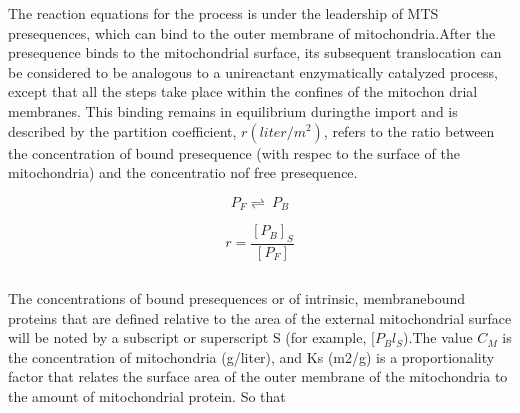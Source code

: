 The reaction equations for the process is under the leadership of MTS presequences, which can bind to the outer membrane of mitochondria.After the presequence binds to the mitochondrial surface, its subsequent translocation can be considered to be analogous to a unireactant enzymatically catalyzed process, except that all the steps take place within the confines of the mitochon­ drial membranes. This binding remains in equilibrium dur­ingthe import and is described by  the partition  coefficient,  $r (liter/ 
m^2)$,  refers to the ratio between the concentration of bound presequence (with re­spec to the surface of the mitochondria) and the concentra­tio nof free presequence. 

\begin{equation}
P_F\rightleftharpoons\ P_B
\end{equation}

\begin{equation}
r=\frac{[P_B]_S}{[P_F]}
\end{equation}

\begin{equation}
\end{equation}

The concentrations of bound presequences or of intrinsic, membranebound proteins that are defined relative to the area of the external mitochondrial surface will be noted by a subscript or superscript S (for example, $[P_Bl_S$).The value $C_M$ is the concentration of mitochondria (g/liter), and Ks (m2/g) is a proportionality factor that relates the surface area of the outer membrane of the mitochondria to the amount of mitochondrial protein. So that

